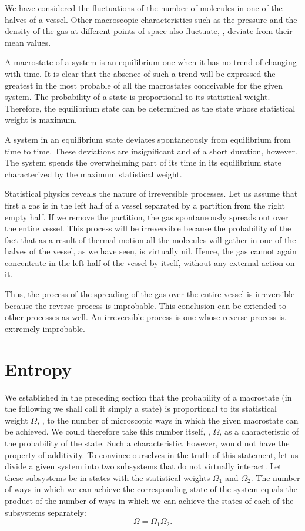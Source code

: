 We have considered the fluctuations of the number of molecules in one of the halves of a vessel. Other macroscopic characteristics such as the pressure and the density of the gas at different points of space also fluctuate, \ie, deviate from their mean values.

A macrostate of a system is an equilibrium one when it has no trend of changing with time. It is clear that the absence of such a trend will be expressed the greatest in the most probable of all the macrostates conceivable for the given system. The probability of a state is proportional to its statistical weight. Therefore, the equilibrium state can be determined as the state whose statistical weight is maximum.

A system in an equilibrium state deviates spontaneously from equilibrium from time to time. These deviations are insignificant and of a short duration, however. The system spends the overwhelming part of its time in its equilibrium state characterized by the maximum statistical weight.

Statistical physics reveals the nature of irreversible processes. Let us assume that first a gas is in the left half of a vessel separated by a partition from the right empty half. If we remove the partition, the gas spontaneously spreads out over the entire vessel. This process will be irreversible because the probability of the fact that as a result of thermal motion all the molecules will gather in one of the halves of the vessel, as we have seen, is virtually nil. Hence, the gas cannot again concentrate in the left half of the vessel by itself, without any external action on it.

Thus, the process of the spreading of the gas over the entire vessel is irreversible because the reverse process is improbable. This conclusion can be extended to other processes as well. An irreversible process is one whose reverse process is. extremely improbable.

\section{Entropy}\label{sec:11_11}

We established in the preceding section that the probability of a macrostate (in the following we shall call it simply a state) is proportional to its statistical weight $\Omega$, \ie, to the number of microscopic ways in which the given macrostate can be achieved. We could therefore take this number itself, \ie, $\Omega$, as a characteristic of the probability of the state. Such a characteristic, however, would not have the property of additivity. To convince ourselves in the truth of this statement, let us divide a given system into two subsystems that do not virtually interact. Let these subsystems be in states with the statistical weights $\Omega_1$ and $\Omega_2$. The number of ways in which we can achieve the corresponding state of the system equals the product of the number of ways in which we can achieve the states of each of the subsystems separately:
\begin{equation}\label{eq:11_91}
	\Omega = \Omega_1\Omega_2.
\end{equation}

